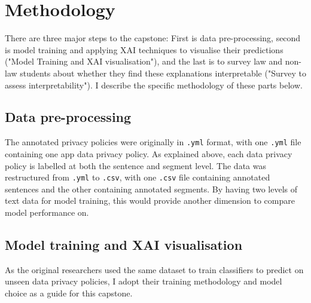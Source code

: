 
\chapter{Methodology} %

\label{Chapter3} %

There are three major steps to the capstone: First is data pre-processing, second is model training and applying XAI techniques to visualise their predictions ("Model Training and XAI visualisation"), and the last is to survey law and non-law students about whether they find these explanations interpretable ("Survey to assess interpretability"). I describe the specific methodology of these parts below.


\section{Data pre-processing}
The annotated privacy policies were originally in \texttt{.yml} format, with one \texttt{.yml} file containing one app data privacy policy. As explained above, each data privacy policy is labelled at both the sentence and segment level. The data was restructured from \texttt{.yml} to \texttt{.csv}, with one \texttt{.csv} file containing annotated sentences and the other containing annotated segments. By having two levels of text data for model training, this would provide another dimension to compare model performance on.


\section{Model training and XAI visualisation}

As the original researchers used the same dataset to train classifiers to predict on unseen data privacy policies, I adopt their training methodology and model choice as a guide for this capstone. 

